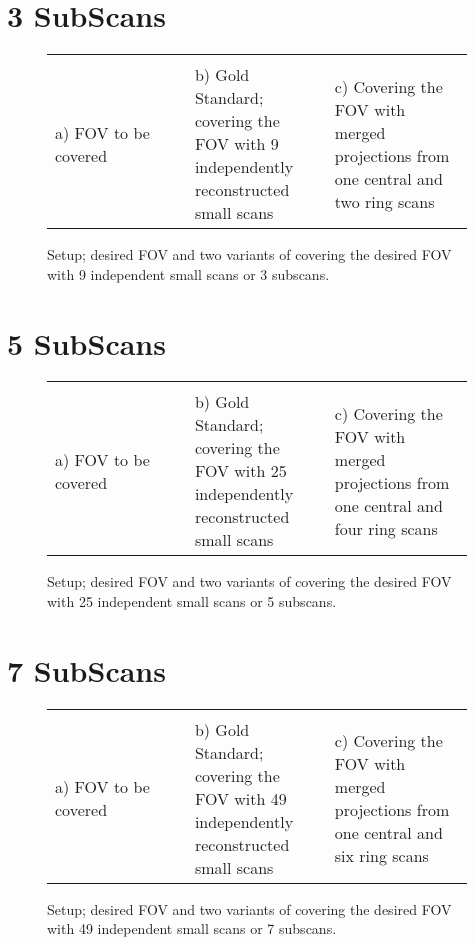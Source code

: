 \documentclass{article}
\begin{document}
\section{3 SubScans}
\begin{figure}[h]
	\centering
	\caption{Setup; desired FOV and two variants of covering the desired FOV with 9 independent small scans or 3 subscans.}
	\begin{tabular}{p{0.33\linewidth}p{0.33\linewidth}p{0.33\linewidth}}
		 &%
		 &%
		\\%
		a) FOV to be covered &%
		b) Gold Standard; covering the FOV with 9 independently reconstructed small scans&%
		c) Covering the FOV with merged projections from one central and two ring scans\\
	\end{tabular}
\end{figure}

\section{5 SubScans}
\begin{figure}[h]
	\centering
	\caption{Setup; desired FOV and two variants of covering the desired FOV with 25 independent small scans or 5 subscans.}
	\begin{tabular}{p{0.33\linewidth}p{0.33\linewidth}p{0.33\linewidth}}
		 &%
		 &%
		\\%
		a) FOV to be covered &%
		b) Gold Standard; covering the FOV with 25 independently reconstructed small scans&%
		c) Covering the FOV with merged projections from one central and four ring scans\\
	\end{tabular}
\end{figure}

\section{7 SubScans}
\begin{figure}[h]
	\centering
	\caption{Setup; desired FOV and two variants of covering the desired FOV with 49 independent small scans or 7 subscans.}
	\begin{tabular}{p{0.33\linewidth}p{0.33\linewidth}p{0.33\linewidth}}
		 &%
		 &%
		\\%
		a) FOV to be covered &%
		b) Gold Standard; covering the FOV with 49 independently reconstructed small scans&%
		c) Covering the FOV with merged projections from one central and six ring scans\\
	\end{tabular}
\end{figure}
\end{document}

